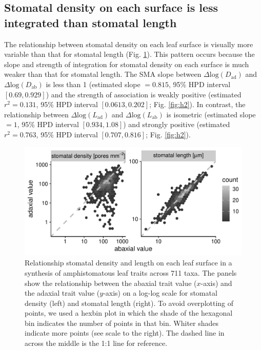 \documentclass[
  10pt,
]{article}
\begin{document}
\hypertarget{stomatal-density-on-each-surface-is-less-integrated-than-stomatal-length}{%
\subsection{Stomatal density on each surface is less integrated than stomatal length}\label{stomatal-density-on-each-surface-is-less-integrated-than-stomatal-length}}

The relationship between stomatal density on each leaf surface is visually more variable than that for stomatal length (Fig. \ref{fig:h2_raw}). This pattern occurs because the slope and strength of integration for stomatal density on each surface is much weaker than that for stomatal length. The SMA slope between \(\Delta \text{log}(D_\text{ad})\) and \(\Delta \text{log}(D_\text{ab})\) is less than 1 (estimated slope \(= 0.815\), 95\% HPD interval \([0.69,0.929]\)) and the strength of association is weakly positive (estimated \(r^2 = 0.131\), 95\% HPD interval \([0.0613,0.202]\); Fig. \ref{fig:h2}). In contrast, the relationship between \(\Delta \text{log}(L_\text{ad})\) and \(\Delta \text{log}(L_\text{ab})\) is isometric (estimated slope \(= 1\), 95\% HPD interval \([0.934,1.08]\)) and strongly positive (estimated \(r^2 = 0.763\), 95\% HPD interval \([0.707,0.816]\); Fig. \ref{fig:h2}).

\begin{figure}[ht]
\includegraphics[width=\textwidth]{../figures/h2-raw.pdf}
\caption{Relationship stomatal density and length on each leaf surface in a synthesis of amphistomatous leaf traits across 711 taxa. The panels show the relationship between the abaxial trait value ($x$-axis) and the adaxial trait value ($y$-axis) on a log-log scale for stomatal density (left) and stomatal length (right). To avoid overplotting of points, we used a hexbin plot in which the shade of the hexagonal bin indicates the number of points in that bin. Whiter shades indicate more points (see scale to the right). The dashed line in across the middle is the 1:1 line for reference.}
\label{fig:h2_raw}
\end{figure}
\end{document}
